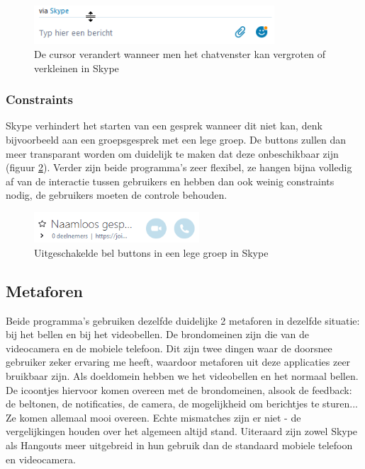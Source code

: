 \documentclass[11pt]{article}
\begin{document}
\begin{figure}
	\centering
	\includegraphics[width=0.8\textwidth]{Niels_SResize.png}
	\caption{De cursor verandert wanneer men het chatvenster kan vergroten of verkleinen in Skype}
	\label{fig:resize}
\end{figure}
\subsubsection{Constraints}
Skype verhindert het starten van een gesprek wanneer dit niet kan, denk bijvoorbeeld aan een groepsgesprek met een lege groep. De buttons zullen dan meer transparant worden om duidelijk te maken dat deze onbeschikbaar zijn (figuur \ref{fig:skypeconstraint}). Verder zijn beide programma's zeer flexibel, ze hangen bijna volledig af van de interactie tussen gebruikers en hebben dan ook weinig constraints nodig, de gebruikers moeten de controle behouden.
\begin{figure}
	\centering
	\includegraphics[width=0.55\textwidth]{Niels_SConstraint.png}
	\caption{Uitgeschakelde bel buttons in een lege groep in Skype}
	\label{fig:skypeconstraint}
\end{figure}
\newpage
\subsection{Metaforen}
Beide programma's gebruiken dezelfde duidelijke 2 metaforen in dezelfde situatie: bij het bellen en bij het videobellen.
De brondomeinen zijn die van de videocamera en de mobiele telefoon. Dit zijn twee dingen waar de doorsnee gebruiker zeker ervaring me heeft, waardoor metaforen uit deze applicaties zeer bruikbaar zijn.
Als doeldomein hebben we het videobellen en het normaal bellen. De icoontjes hiervoor komen overeen met de brondomeinen, alsook de feedback: de beltonen, de notificaties, de camera, de mogelijkheid om berichtjes te sturen... Ze komen allemaal mooi overeen.
Echte mismatches zijn er niet - de vergelijkingen houden over het algemeen altijd stand. Uiteraard zijn zowel Skype als Hangouts meer uitgebreid in hun gebruik dan de standaard mobiele telefoon en videocamera.
\newpage
\end{document}
